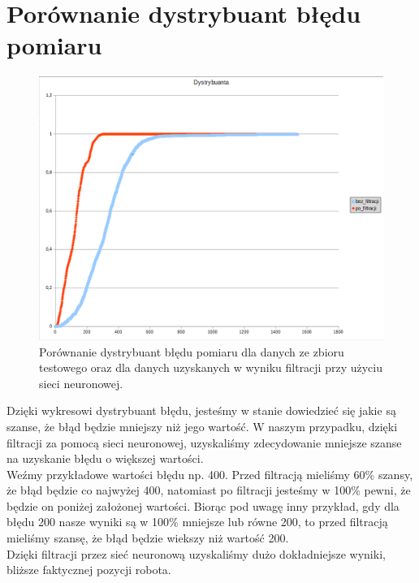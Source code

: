 \documentclass{classrep}
\begin{document}
\section{Porównanie dystrybuant błędu pomiaru}
{
	\begin{figure}[htp]
	\centering
	\includegraphics[width=15cm]{Wykres.png}
	\caption{Porównanie dystrybuant błędu pomiaru dla danych ze zbioru testowego oraz dla danych uzyskanych w wyniku filtracji przy użyciu sieci neuronowej. }
	\label{fig:lion}
	\end{figure}
	Dzięki wykresowi dystrybuant błędu, jesteśmy w stanie dowiedzieć się jakie są szanse, że błąd będzie mniejszy niż jego wartość. W naszym przypadku, dzięki filtracji za pomocą sieci neuronowej, uzyskaliśmy zdecydowanie mniejsze szanse na uzyskanie błędu o większej wartości. \\ 
	Weźmy przykładowe wartości błędu np. 400. Przed filtracją mieliśmy 60\% szansy, że błąd będzie co najwyżej 400, natomiast po filtracji jesteśmy w 100\% pewni, że będzie on poniżej założonej wartości. Biorąc pod uwagę inny przykład, gdy dla błędu 200 nasze wyniki są w 100\% mniejsze lub równe 200, to przed filtracją mieliśmy szansę, że błąd będzie wiekszy niż wartość 200.\\
	Dzięki filtracji przez sieć neuronową uzyskaliśmy dużo dokładniejsze wyniki, bliższe faktycznej pozycji robota.
}
\end{document}
